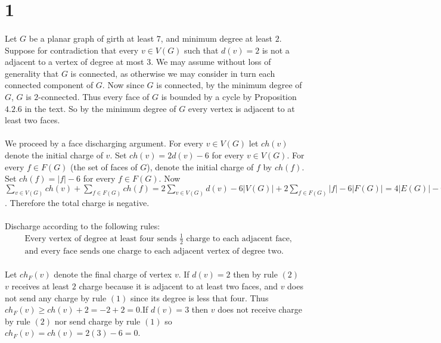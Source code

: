 \documentclass[letterpaper,12pt,oneside,onecolumn]{report}
\begin{document}
\section*{1}
\paragraph{}
Let $G$ be a planar graph of girth at least $7$, and minimum degree at least $2$. Suppose for contradiction that every $v \in V(G)$ such that $d(v) = 2$ is not a adjacent to a vertex of degree at most $3$. We may assume without loss of generality that $G$ is connected, as otherwise we may consider in turn each connected component of $G$. Now since $G$ is connected, by the minimum degree of $G$, $G$ is $2$-connected. Thus every face of $G$ is bounded by a cycle by Proposition $4.2.6$ in the text. So by the minimum degree of $G$ every vertex is adjacent to at least two faces.
\paragraph{}
We proceed by a face discharging argument. For every $v \in V(G)$ let $ch(v)$ denote the initial charge of $v$. Set $ch(v) = 2d(v) - 6$ for every $v \in V(G)$. For every $f \in F(G)$ (the set of faces of $G$), denote the initial charge of $f$ by $ch(f)$.  Set $ch(f) = |f| - 6$ for every $f \in F(G)$. Now $\sum_{v\in V(G)} ch(v) + \sum_{f\in F(G)} ch(f) = 2\sum_{v \in V(G)}d(v) - 6|V(G)| +  2\sum_{f \in F(G)}|f| - 6|F(G)| = 4|E(G)| - 6|V(G)| + 2|E(G)| - 6|F(G)| = -6(|V(G)| - |E(G)| + |F(G)|) = -12$. Therefore the total charge is negative.
\paragraph{}
Discharge according to the following rules:
\begin{align}
&\text{Every vertex of degree at least four sends $\frac{1}{2}$ charge to each adjacent face,}\\
&\text{and every face sends one charge to each adjacent vertex of degree two.}
\end{align}
\paragraph{}
Let $ch_F(v)$ denote the final charge of vertex $v$. If $d(v) = 2$ then by rule $(2)$ $v$ receives at least $2$ charge because it is adjacent to at least two faces, and $v$ does not send any charge by rule $(1)$ since its degree is less that four. Thus $ch_F(v) \geq ch(v) + 2 = -2 + 2 = 0$.If $d(v) = 3$ then $v$ does not receive charge by rule $(2)$ nor send charge by rule $(1)$ so $ch_F(v) = ch(v) = 2(3) - 6 = 0$.
\end{document}
